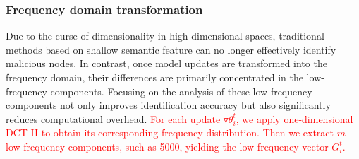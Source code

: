 \documentclass[lettersize,journal]{IEEEtran}
\begin{document}

\subsubsection{Frequency domain transformation}
Due to the curse of dimensionality in high-dimensional spaces, traditional methods based on shallow semantic
feature can no longer effectively identify malicious nodes. In contrast, once model updates are transformed into the frequency domain, their differences are primarily concentrated in the low-frequency components. Focusing on the analysis of these low-frequency components not only improves identification accuracy but also significantly reduces computational overhead. \textcolor{red}{For each update \(\triangledown \theta_i^t\), we apply one-dimensional DCT-II \cite{ahmed1974discrete} to obtain its corresponding frequency distribution. Then we extract $m$ low-frequency components\cite{fereidooni2023freqfed}, such as 5000, yielding the low-frequency vector $G_i^t$.}
\end{document}
